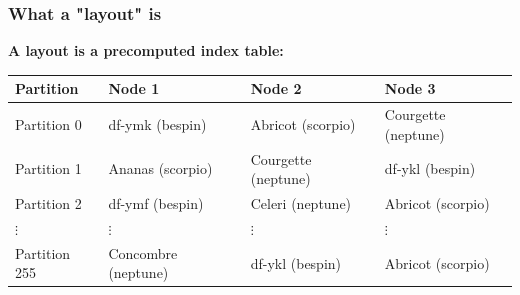\documentclass[aspectratio=169,xcolor={svgnames}]{beamer}
\begin{document}
\begin{frame}
	\frametitle{What a "layout" is}
		\textbf{A layout is a precomputed index table:}
		\vspace{1em}

		{\footnotesize
			\begin{center}
			\begin{tabular}{|l|l|l|l|}
				\hline
				\textbf{Partition} & \textbf{Node 1} & \textbf{Node 2} & \textbf{Node 3} \\
				\hline
				\hline
				Partition 0 & df-ymk (bespin) & Abricot (scorpio) & Courgette (neptune) \\
				\hline
				Partition 1 & Ananas (scorpio) & Courgette (neptune) & df-ykl (bespin) \\
				\hline
				Partition 2 & df-ymf (bespin) & Celeri (neptune) & Abricot (scorpio) \\
				\hline
				\hspace{1em}$\vdots$ & \hspace{1em}$\vdots$ & \hspace{1em}$\vdots$ & \hspace{1em}$\vdots$ \\
				\hline
				Partition 255 & Concombre (neptune) & df-ykl (bespin) & Abricot (scorpio) \\
				\hline
			\end{tabular}
			\end{center}
		}

	\vspace{2em}

	\vspace{1em}
\end{frame}
\end{document}
